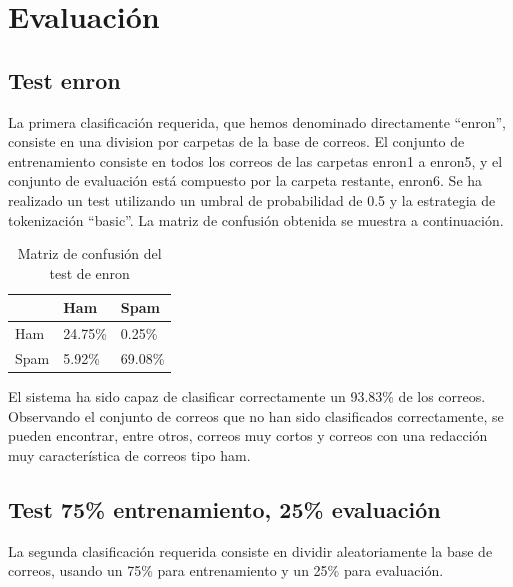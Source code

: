 \section{Evaluación}

\subsection{Test enron}

La primera clasificación requerida, que hemos denominado directamente ``enron'',
consiste en una division por carpetas de la base de correos. El conjunto de
entrenamiento consiste en todos los correos de las carpetas enron1 a enron5, y
el conjunto de evaluación está compuesto por la carpeta restante, enron6. Se ha
realizado un test utilizando un umbral de probabilidad de 0.5 y la estrategia de
tokenización ``basic''. La matriz de confusión obtenida se muestra a
continuación.

\begin{table}[ht]
	\centering
	\begin{tabular}{l|l|l|}
	\cline{2-3}
				   & Ham     & Spam    \\ \hline
	\multicolumn{1}{|l|}{Ham}  & 24.75\% & 0.25\%  \\ \hline
	\multicolumn{1}{|l|}{Spam} & 5.92\%  & 69.08\% \\ \hline
	\end{tabular}
	\caption{Matriz de confusión del test de enron}
	\label{tab:test-enron}
\end{table}

El sistema ha sido capaz de clasificar correctamente un 93.83\% de los correos.
Observando el conjunto de correos que no han sido clasificados correctamente, se
pueden encontrar, entre otros, correos muy cortos y correos con una redacción
muy característica de correos tipo ham.

\clearpage
\subsection{Test 75\% entrenamiento, 25\% evaluación}

La segunda clasificación requerida consiste en dividir aleatoriamente la base de
correos, usando un 75\% para entrenamiento y un 25\% para evaluación.

